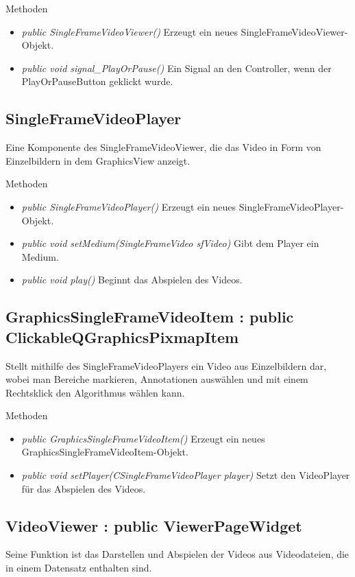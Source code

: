 Methoden
\begin{itemize}
	\item\textit{public SingleFrameVideoViewer()} 
	Erzeugt ein neues SingleFrameVideoViewer-Objekt.
	\item\textit{public void signal\_PlayOrPause()} 
	Ein Signal an den Controller, wenn der PlayOrPauseButton geklickt wurde.
\end{itemize} 

\subsection*{SingleFrameVideoPlayer} 
Eine Komponente des SingleFrameVideoViewer, die das Video in Form von Einzelbildern in dem GraphicsView anzeigt.

Methoden
\begin{itemize}
	\item\textit{public SingleFrameVideoPlayer()} 
	Erzeugt ein neues SingleFrameVideoPlayer-Objekt.
	\item\textit{public void setMedium(SingleFrameVideo sfVideo)} 
	Gibt dem Player ein Medium.
	\item\textit{public void play()} 
	Beginnt das Abspielen des Videos.
\end{itemize}

\subsection*{GraphicsSingleFrameVideoItem : public ClickableQGraphicsPixmapItem}
Stellt mithilfe des SingleFrameVideoPlayers ein Video aus Einzelbildern dar, wobei man Bereiche markieren, Annotationen auswählen und mit einem Rechtsklick den Algorithmus wählen kann.

Methoden
\begin{itemize}
	\item\textit{public GraphicsSingleFrameVideoItem()} 
	Erzeugt ein neues GraphicsSingleFrameVideoItem-Objekt.
	\item\textit{public void setPlayer(CSingleFrameVideoPlayer player)} 
	Setzt den VideoPlayer für das Abspielen des Videos.
\end{itemize}

\subsection*{VideoViewer : public ViewerPageWidget}
Seine Funktion ist das Darstellen und Abspielen der Videos aus Videodateien, die in einem Datensatz enthalten sind.

